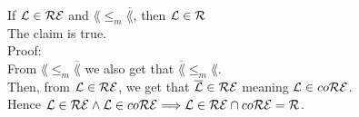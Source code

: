 If $\mathcal{L} \in \mathcal{R}\mathcal{E}$ and $\lang \leq_m \overline{\lang}$, then $\mathcal{L} \in \mathcal{R}$ \\

The claim is true. \\

Proof: \\
From $\lang \leq_m \overline{\lang}$ we also get that $\overline{\lang} \leq_m \lang$.  \\
Then, from $\mathcal{L} \in \mathcal{R}\mathcal{E}$, we get that $\overline{\mathcal{L}} \in \mathcal{R}\mathcal{E}$ meaning $\mathcal{L} \in co\mathcal{R}\mathcal{E}$. \\
Hence $\mathcal{L} \in \mathcal{R}\mathcal{E} \wedge \mathcal{L} \in co\mathcal{R}\mathcal{E} \Longrightarrow \mathcal{L} \in \mathcal{R}\mathcal{E} \cap co\mathcal{R}\mathcal{E} = \mathcal{R}$. \\
